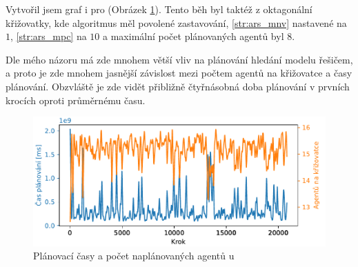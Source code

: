 Vytvořil jsem graf i pro  (Obrázek \ref{fig:cas_vs_agenti_satra}).
Tento běh byl taktéž z oktagonální křižovatky, kde algoritmus měl povolené zastavování,
\ref{str:ars_mnv} nastavené na $1$, \ref{str:ars_mpc} na $10$ a maximální počet plánovaných agentů byl $8$.

Dle mého názoru má zde mnohem větší vliv na plánování hledání modelu řešičem,
a proto je zde mnohem jasnější závislost mezi počtem agentů na křižovatce a časy plánování.
Obzvláště je zde vidět přibližně čtyřnásobná doba plánování v prvních krocích oproti průměrnému času.


\begin{figure}[h]
	\centering
	\includegraphics[width=140mm]{../img/CasVsAgentiSATRA}
	\caption{Plánovací časy a počet naplánovaných agentů u }
	\label{fig:cas_vs_agenti_satra}
\end{figure}

